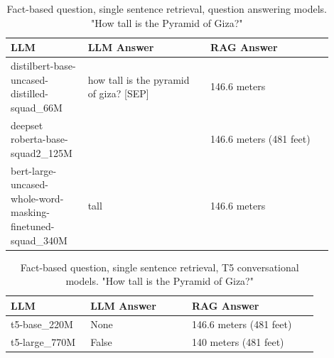 \documentclass{wseas}
\begin{document}
\begin{table}[htbp]
  \centering
  \caption{Fact-based question, single sentence retrieval, question answering models. "How tall is the Pyramid of Giza?"} %
  \label{tab:experiment_R_1_sentence_Q_fact_M_question_answering_table}  %
    \begin{tabular}{|p{0.2\linewidth}|p{0.35\linewidth}|p{0.35\linewidth}|}
      \hline
      \textbf{LLM} & \textbf{LLM Answer} & \textbf{RAG Answer} \\ \hline
      \makecell[l]{distilbert-base-uncased-\\distilled-squad\_66M} & how tall is the pyramid of giza? {[}SEP{]} & 146.6 meters \\ \hline
      \makecell[l]{deepset roberta-base-\\squad2\_125M} &  & 146.6 meters (481 feet) \\ \hline
      \makecell[l]{bert-large-uncased-\\whole-word-masking-\\finetuned-squad\_340M} & tall & 146.6 meters \\ \hline
    \end{tabular}
\end{table}
\begin{table}[htbp]
  \centering
  \caption{Fact-based question, single sentence retrieval, T5 conversational models. "How tall is the Pyramid of Giza?"} %
  \label{tab:experiment_R_1_sentence_Q_fact_M_T5_table}  %
  \begin{tabular}{|p{0.22\linewidth}|p{0.29\linewidth}|p{0.35\linewidth}|}
    \hline
    \textbf{LLM} & \textbf{LLM Answer} & \textbf{RAG Answer} \\ \hline
    t5-base\_220M & None & 146.6 meters (481 feet) \\ \hline
    t5-large\_770M & False & 140 meters (481 feet) \\ \hline
  \end{tabular}
\end{table}
\end{document}
